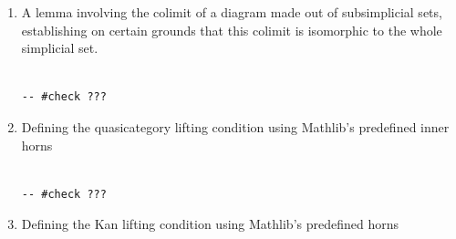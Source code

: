 \documentclass{book}
\theoremstyle{definition}
\newcounter{lcounter}
\begin{document}
\begin{enumerate}
\begin{center}
\begin{tcolorbox}[width=5in,colback={white},title={\begin{center}\texttt{Lean \thelcounter} \addtocounter{lcounter}{1}  \end{center}},colbacktitle=Blue,coltitle=black]
\begin{verbatim}
\end{verbatim}
\end{tcolorbox}
\end{center}


\item A lemma involving the colimit of a diagram made out of subsimplicial sets, establishing on certain grounds that this colimit is isomorphic to the whole simplicial set.

\begin{center}
\begin{tcolorbox}[width=5in,colback={white},title={\begin{center}\texttt{Lean \thelcounter} \addtocounter{lcounter}{1}  \end{center}},colbacktitle=Blue,coltitle=black]
\begin{verbatim}

-- #check ???

\end{verbatim}
\end{tcolorbox}
\end{center}

\item Defining the quasicategory lifting condition using Mathlib's predefined inner horns

\begin{center}
\begin{tcolorbox}[width=5in,colback={white},title={\begin{center}\texttt{Lean \thelcounter} \addtocounter{lcounter}{1}  \end{center}},colbacktitle=Blue,coltitle=black]
\begin{verbatim}

-- #check ???

\end{verbatim}
\end{tcolorbox}
\end{center}

\item Defining the Kan lifting condition using Mathlib's predefined horns

\begin{center}
\begin{tcolorbox}[width=5in,colback={white},title={\begin{center}\texttt{Lean \thelcounter} \addtocounter{lcounter}{1}  \end{center}},colbacktitle=Blue,coltitle=black]
\begin{verbatim}


\end{verbatim}
\end{tcolorbox}
\end{center}
\end{enumerate}
\end{document}
